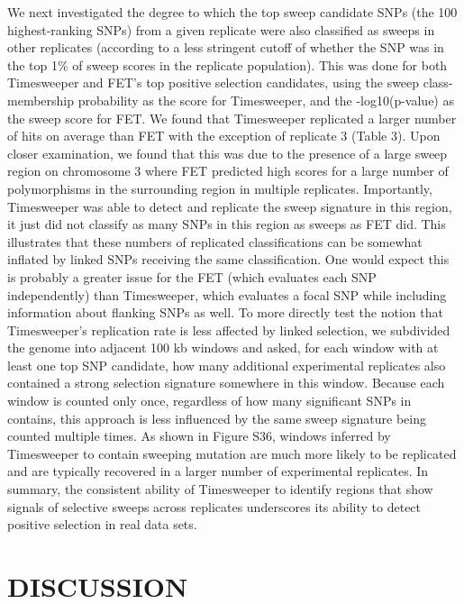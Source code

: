 We next investigated the degree to which the top sweep candidate SNPs (the 100 highest-ranking SNPs) from a given replicate were also classified as sweeps in other replicates (according to a less stringent cutoff of whether the SNP was in the top 1\% of sweep scores in the replicate population). This was done for both Timesweeper and FET’s top positive selection candidates, using the sweep class-membership probability as the score for Timesweeper, and the -log10(p-value) as the sweep score for FET. We found that Timesweeper replicated a larger number of hits on average than FET with the exception of replicate 3 (Table 3). Upon closer examination, we found that this was due to the presence of a large sweep region on chromosome 3 where FET predicted high scores for a large number of polymorphisms in the surrounding region in multiple replicates. Importantly, Timesweeper was able to detect and replicate the sweep signature in this region, it just did not classify as many SNPs in this region as sweeps as FET did. This illustrates that these numbers of replicated classifications can be somewhat inflated by linked SNPs receiving the same classification. One would expect this is probably a greater issue for the FET (which evaluates each SNP independently) than Timesweeper, which evaluates a focal SNP while including information about flanking SNPs as well. To more directly test the notion that Timesweeper’s replication rate is less affected by linked selection, we subdivided the genome into adjacent 100 kb windows and asked, for each window with at least one top SNP candidate, how many additional experimental replicates also contained a strong selection signature somewhere in this window. Because each window is counted only once, regardless of how many significant SNPs in contains, this approach is less influenced by the same sweep signature being counted multiple times. As shown in Figure S36, windows inferred by Timesweeper to contain sweeping mutation are much more likely to be replicated and are typically recovered in a larger number of experimental replicates. In summary, the consistent ability of Timesweeper to identify regions that show signals of selective sweeps across replicates underscores its ability to detect positive selection in real data sets. 

\section{DISCUSSION}

